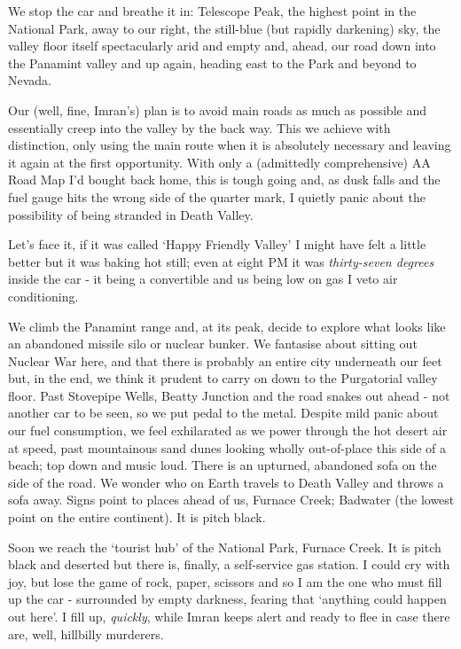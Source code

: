 \documentclass[a5paper,titlepage,11pt]{book}
\begin{document}
We stop the car and breathe it in: Telescope Peak, the highest point in the National Park, away to our right, the still-blue (but rapidly darkening) sky, the valley floor itself spectacularly arid and empty and, ahead, our road down into the Panamint valley and up again, heading east to the Park and beyond to Nevada.

Our (well, fine, Imran's) plan is to avoid main roads as much as possible and essentially creep into the valley by the back way.  This we achieve with distinction, only using the main route when it is absolutely necessary and leaving it again at the first opportunity.  With only a (admittedly comprehensive) AA Road Map I'd bought back home, this is tough going and, as dusk falls and the fuel gauge hits the wrong side of the quarter mark, I quietly panic about the possibility of being stranded in Death Valley.

Let's face it, if it was called `Happy Friendly Valley' I might have felt a little better but it was baking hot still; even at eight PM it was \emph{thirty-seven degrees} inside the car - it being a convertible and us being low on gas I veto air conditioning.

We climb the Panamint range and, at its peak, decide to explore what looks like an abandoned missile silo or nuclear bunker.  We fantasise about sitting out Nuclear War here, and that there is probably an entire city underneath our feet but, in the end, we think it prudent to carry on down to the Purgatorial valley floor.  Past Stovepipe Wells, Beatty Junction and the road snakes out ahead - not another car to be seen, so we put pedal to the metal.  Despite mild panic about our fuel consumption, we feel exhilarated as we power through the hot desert air at speed, past mountainous sand dunes looking wholly out-of-place this side of a beach; top down and music loud.  There is an upturned, abandoned sofa on the side of the road.  We wonder who on Earth travels to Death Valley and throws a sofa away.  Signs point to places ahead of us, Furnace Creek; Badwater (the lowest point on the entire continent).  It is pitch black.

Soon we reach the `tourist hub' of the National Park, Furnace Creek.  It is pitch black and deserted but there is, finally, a self-service gas station.   I could cry with joy, but lose the game of rock, paper, scissors and so I am the one who must fill up the car - surrounded by empty darkness, fearing that `anything could happen out here'.  I fill up, \emph{quickly}, while Imran keeps alert and ready to flee in case there are, well, hillbilly murderers.
\end{document}
